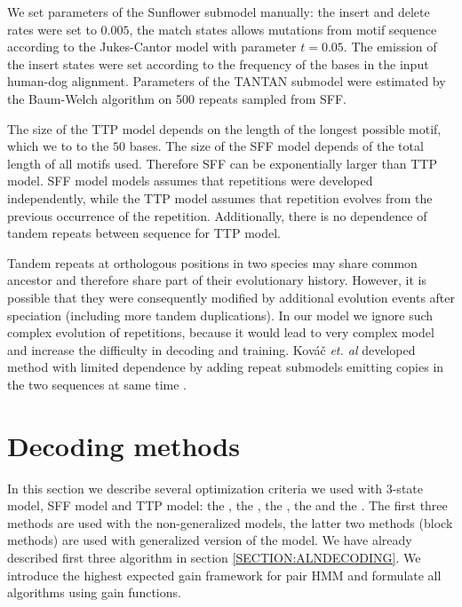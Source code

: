 We set parameters of the Sunflower submodel manually: the insert and delete
rates were set to $0.005$, the match states allows mutations from motif
sequence according to the Jukes-Cantor model with parameter $t=0.05$. The
emission of the insert states were set according to the frequency of the bases
in the input human-dog alignment.  Parameters of the TANTAN submodel were
estimated by the Baum-Welch algorithm \cite{Durbin1998} on 500 repeats sampled
from SFF.

The size of the TTP model depends on the length of the longest possible motif,
which we to to the $50$ bases. The size of the SFF model depends of the total
length of all motifs used. Therefore SFF can be exponentially larger than TTP
model. SFF model models assumes that repetitions were developed independently,
while the TTP model assumes that repetition evolves from the previous
occurrence of the repetition. Additionally, there is no dependence of tandem
repeats between sequence for TTP model.

Tandem repeats at orthologous positions in two species may share common
ancestor and therefore share part of their evolutionary history. However, it is
possible that they were consequently modified by additional evolution events
after speciation (including more tandem duplications). In our model we ignore
such complex evolution of repetitions, because it would lead to very complex
model and increase the difficulty in decoding and training. Kováč {\it et. al}
developed method with limited dependence by adding repeat submodels emitting
copies in the two sequences at same time \cite{Kovac2012}.

\section{Decoding methods}
In this section we describe several optimization criteria we used with 3-state
model, SFF model and TTP model: the , the
, the , the  and the
. The first three methods are used
with the non-generalized models, the latter two methods (block methods) are
used with generalized version of the model. We have already described first
three algorithm in section \ref{SECTION:ALNDECODING}.  We introduce the highest
expected gain framework for pair HMM and formulate all algorithms using gain
functions.

